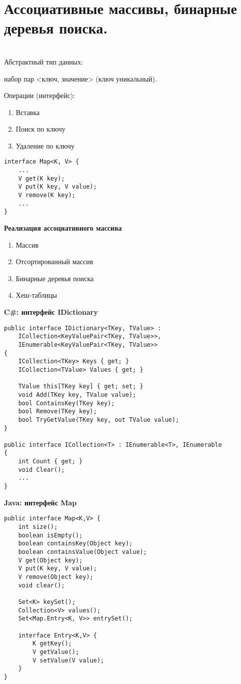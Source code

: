 \section {Ассоциативные массивы, бинарные деревья поиска.}
\\
Абстрактный тип данных:

\qquad набор пар <ключ, значение> (ключ уникальный).

Операции (интерфейс):
\begin{enumerate}
\item Вставка
\item Поиск по ключу
\item Удаление по ключу
\end{enumerate}

\begin{verbatim}
interface Map<K, V> {
    ...
    V get(K key);
    V put(K key, V value);
    V remove(K key);
    ...
}
\end{verbatim}

{\bf Реализация ассоциативного массива}\\
\begin{enumerate}
\item Массив
\item Отсортированный массив
\item Бинарные деревья поиска
\item Хеш-таблицы
\end{enumerate}

{\bf C\#: интерфейс IDictionary}\\
\begin{verbatim}
public interface IDictionary<TKey, TValue> :
    ICollection<KeyValuePair<TKey, TValue>>,
    IEnumerable<KeyValuePair<TKey, TValue>>
{
    ICollection<TKey> Keys { get; }
    ICollection<TValue> Values { get; }
    
    TValue this[TKey key] { get; set; }
    void Add(TKey key, TValue value);
    bool ContainsKey(TKey key);
    bool Remove(TKey key);
    bool TryGetValue(TKey key, out TValue value);
}

public interface ICollection<T> : IEnumerable<T>, IEnumerable
{
    int Count { get; }
    void Clear();
    ...
}
\end{verbatim}

{\bf Java: интерфейс Map}\\
\begin{verbatim}
public interface Map<K,V> {
    int size();
    boolean isEmpty();
    boolean containsKey(Object key);
    boolean containsValue(Object value);
    V get(Object key);
    V put(K key, V value);
    V remove(Object key);
    void clear();

    Set<K> keySet();
    Collection<V> values();
    Set<Map.Entry<K, V>> entrySet();
    
    interface Entry<K,V> {
        K getKey();
        V getValue();
        V setValue(V value);
    }
}
\end{verbatim}


